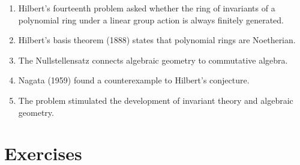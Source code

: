 \begin{enumerate}
    \item Hilbert's fourteenth problem asked whether the ring of invariants of a polynomial ring under a linear group action is always finitely generated.
    \item Hilbert's basis theorem (1888) states that polynomial rings are Noetherian.
    \item The Nullstellensatz connects algebraic geometry to commutative algebra.
    \item Nagata (1959) found a counterexample to Hilbert's conjecture.
    \item The problem stimulated the development of invariant theory and algebraic geometry.
\end{enumerate}

\section{Exercises}

